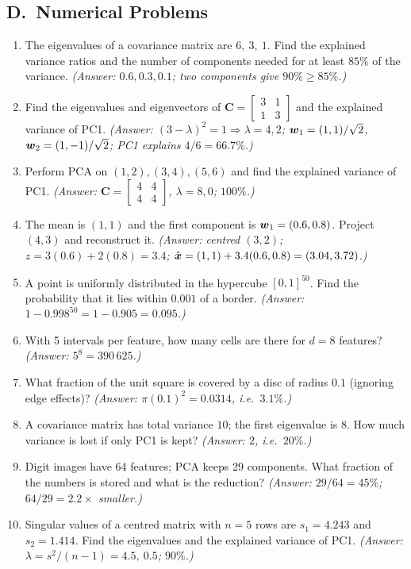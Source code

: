 \subsection*{D.\ Numerical Problems}
\begin{enumerate}
  \item The eigenvalues of a covariance matrix are $6,\ 3,\ 1$. Find the explained variance ratios and the number of components needed for at least $85\%$ of the variance. \textit{(Answer: $0.6,0.3,0.1$; two components give $90\%\ge85\%$.)}
  \item Find the eigenvalues and eigenvectors of $\mathbf C=\begin{bmatrix}3&1\\1&3\end{bmatrix}$ and the explained variance of PC1. \textit{(Answer: $(3-\lambda)^2=1\Rightarrow\lambda=4,2$; $\boldsymbol{w}_1=(1,1)/\sqrt2$, $\boldsymbol{w}_2=(1,-1)/\sqrt2$; PC1 explains $4/6=66.7\%$.)}
  \item Perform PCA on $(1,2),(3,4),(5,6)$ and find the explained variance of PC1. \textit{(Answer: $\mathbf C=\begin{bmatrix}4&4\\4&4\end{bmatrix}$, $\lambda=8,0$; $100\%$.)}
  \item The mean is $(1,1)$ and the first component is $\boldsymbol{w}_1=(0.6,0.8)$. Project $(4,3)$ and reconstruct it. \textit{(Answer: centred $(3,2)$; $z=3(0.6)+2(0.8)=3.4$; $\hat{\boldsymbol{x}}=(1,1)+3.4(0.6,0.8)=(3.04,3.72)$.)}
  \item A point is uniformly distributed in the hypercube $[0,1]^{50}$. Find the probability that it lies within $0.001$ of a border. \textit{(Answer: $1-0.998^{50}=1-0.905=0.095$.)}
  \item With 5 intervals per feature, how many cells are there for $d=8$ features? \textit{(Answer: $5^8=390\,625$.)}
  \item What fraction of the unit square is covered by a disc of radius $0.1$ (ignoring edge effects)? \textit{(Answer: $\pi(0.1)^2=0.0314$, i.e.\ $3.1\%$.)}
  \item A covariance matrix has total variance $10$; the first eigenvalue is $8$. How much variance is lost if only PC1 is kept? \textit{(Answer: $2$, i.e.\ $20\%$.)}
  \item Digit images have 64 features; PCA keeps 29 components. What fraction of the numbers is stored and what is the reduction? \textit{(Answer: $29/64=45\%$; $64/29=2.2\times$ smaller.)}
  \item Singular values of a centred matrix with $n=5$ rows are $s_1=4.243$ and $s_2=1.414$. Find the eigenvalues and the explained variance of PC1. \textit{(Answer: $\lambda=s^2/(n-1)=4.5,\ 0.5$; $90\%$.)}
\end{enumerate}

